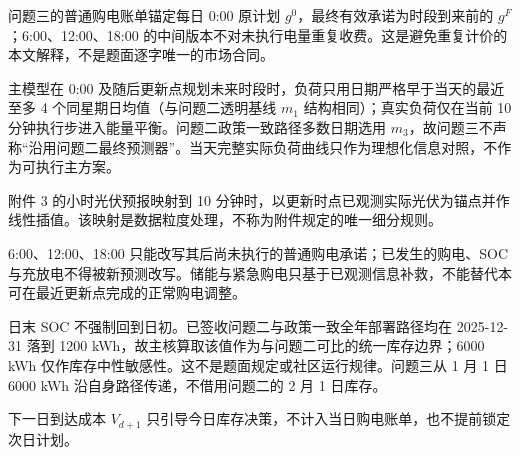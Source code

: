 
\item 问题三的普通购电账单锚定每日 0:00 原计划 \(g^0\)，最终有效承诺为时段到来前的 \(g^F\)；6:00、12:00、18:00 的中间版本不对未执行电量重复收费。这是避免重复计价的本文解释，不是题面逐字唯一的市场合同。

\item 主模型在 0:00 及随后更新点规划未来时段时，负荷只用日期严格早于当天的最近至多 4 个同星期日均值（与问题二透明基线 \(m_1\) 结构相同）；真实负荷仅在当前 10 分钟执行步进入能量平衡。问题二政策一致路径多数日期选用 \(m_3\)，故问题三不声称“沿用问题二最终预测器”。当天完整实际负荷曲线只作为理想化信息对照，不作为可执行主方案。

\item 附件 3 的小时光伏预报映射到 10 分钟时，以更新时点已观测实际光伏为锚点并作线性插值。该映射是数据粒度处理，不称为附件规定的唯一细分规则。

\item 6:00、12:00、18:00 只能改写其后尚未执行的普通购电承诺；已发生的购电、SOC 与充放电不得被新预测改写。储能与紧急购电只基于已观测信息补救，不能替代本可在最近更新点完成的正常购电调整。

\item 日末 SOC 不强制回到日初。已签收问题二与政策一致全年部署路径均在 2025-12-31 落到 1200 kWh，故主核算取该值作为与问题二可比的统一库存边界；6000 kWh 仅作库存中性敏感性。这不是题面规定或社区运行规律。问题三从 1 月 1 日 6000 kWh 沿自身路径传递，不借用问题二的 2 月 1 日库存。

\item 下一日到达成本 \(V_{d+1}\) 只引导今日库存决策，不计入当日购电账单，也不提前锁定次日计划。
